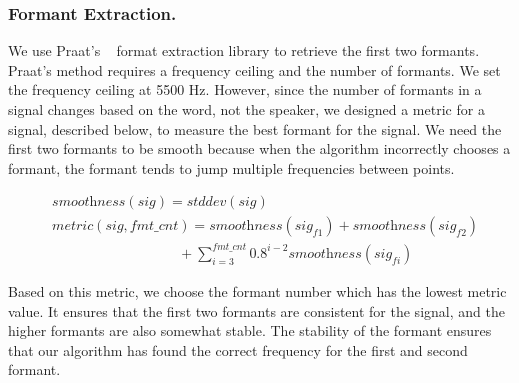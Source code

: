 
\subsubsection{Formant Extraction.}
We use Praat's ~\cite{hugoQuenePraat} format extraction library to retrieve the first two formants. Praat's method requires a frequency ceiling and the number of formants.  We set the frequency ceiling at 5500 Hz. However, since the number of formants in a signal changes based on the word, not the speaker, we designed a metric for a signal, described below, to measure the best formant for the signal. We need the first two formants to be smooth because when the algorithm incorrectly chooses a formant, the formant tends to jump multiple frequencies between points.

 \begin{align*}
     &\textit{smoothness}(sig) = stddev(sig) \\
     &metric(sig,fmt\_cnt) =  \textit{smoothness}(sig_{f1}) + \textit{smoothness}(sig_{f2})\\ &\quad \quad \quad \quad \quad \quad \quad \quad \quad + \sum_{i=3}^{fmt\_cnt} 0.8^{i-2} \textit{smoothness}(sig_{fi})
 \end{align*}

Based on this metric, we choose the formant number which has the lowest metric value. It ensures that the first two formants are consistent for the signal, and the higher formants are also somewhat stable. The stability of the formant ensures that our algorithm has found the correct frequency for the first and second formant.